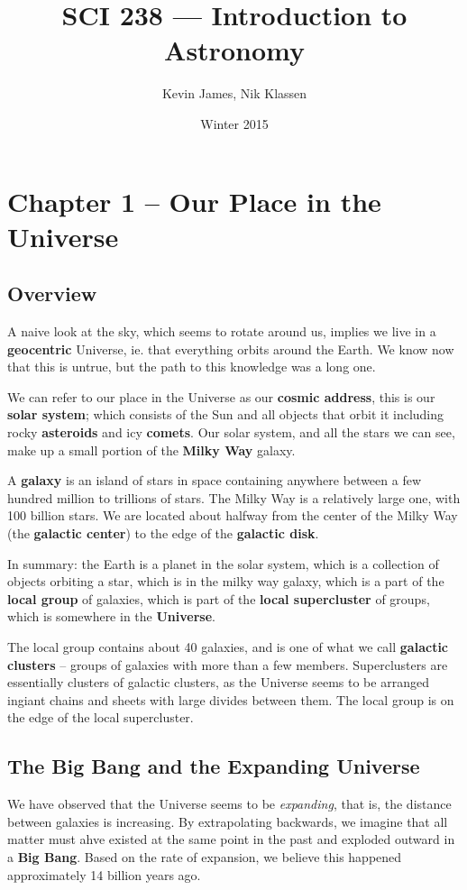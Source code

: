 \documentclass[12pt]{article}
\begin{document}
\title{SCI 238 --- Introduction to Astronomy}
\author{Kevin James, Nik Klassen}
\date{\vspace{-2ex}Winter 2015}
\maketitle\HRule

\tableofcontents
\newpage

\section{Chapter 1 -- Our Place in the Universe}
\subsection{Overview}
A naive look at the sky, which seems to rotate around us, implies we live in a {\bf geocentric} Universe, ie. that everything orbits around the Earth. We know now that this is untrue, but the path to this knowledge was a long one.

We can refer to our place in the Universe as our {\bf cosmic address}, this is our {\bf solar system}; which consists of the Sun and all objects that orbit it including rocky {\bf asteroids} and icy {\bf comets}. Our solar system, and all the stars we can see, make up a small portion of the {\bf Milky Way} galaxy.

A {\bf galaxy} is an island of stars in space containing anywhere between a few hundred million to trillions of stars. The Milky Way is a relatively large one, with 100 billion stars. We are located about halfway from the center of the Milky Way (the {\bf galactic center}) to the edge of the {\bf galactic disk}.

In summary: the Earth is a planet in the solar system, which is a collection of objects orbiting a star, which is in the milky way galaxy, which is a part of the {\bf local group} of galaxies, which is part of the {\bf local supercluster} of groups, which is somewhere in the {\bf Universe}.

The local group contains about 40 galaxies, and is one of what we call {\bf galactic clusters} -- groups of galaxies with more than a few members. Superclusters are essentially clusters of galactic clusters, as the Universe seems to be arranged ingiant chains and sheets with large divides between them. The local group is on the edge of the local supercluster.

\subsection{The Big Bang and the Expanding Universe}
We have observed that the Universe seems to be \emph{expanding}, that is, the distance between galaxies is increasing. By extrapolating backwards, we imagine that all matter must ahve existed at the same point in the past and exploded outward in a {\bf Big Bang}. Based on the rate of expansion, we believe this happened approximately 14 billion years ago.
\end{document}
